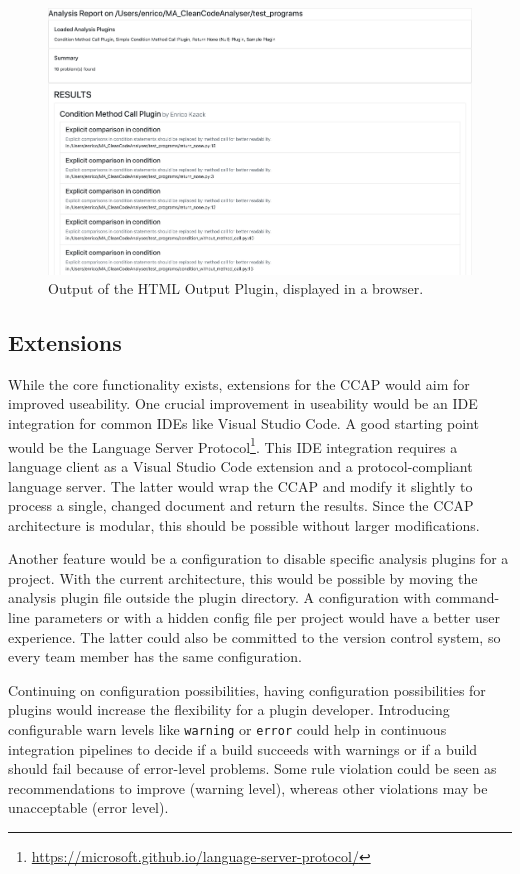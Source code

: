 \begin{figure}
    \includegraphics[width=1\textwidth]{img/CCAP/screenshot_html_output.png}
    \caption{Output of the HTML Output Plugin, displayed in a browser.}
    \label{fig:screen_html_output}
\end{figure}

\subsection{Extensions}
While the core functionality exists, extensions for the CCAP would aim for improved useability. One crucial improvement in useability would be an IDE integration for common IDEs like Visual Studio Code. A good starting point would be the Language Server Protocol\footnote{\url{https://microsoft.github.io/language-server-protocol/}}. This IDE integration requires a language client as a Visual Studio Code extension and a protocol-compliant language server. The latter would wrap the CCAP and modify it slightly to process a single, changed document and return the results. Since the CCAP architecture is modular, this should be possible without larger modifications. 

Another feature would be a configuration to disable specific analysis plugins for a project. With the current architecture, this would be possible by moving the analysis plugin file outside the plugin directory. A configuration with command-line parameters or with a hidden config file per project would have a better user experience. The latter could also be committed to the version control system, so every team member has the same configuration.

Continuing on configuration possibilities, having configuration possibilities for plugins would increase the flexibility for a plugin developer. Introducing configurable warn levels like \texttt{warning} or \texttt{error} could help in continuous integration pipelines to decide if a build succeeds with warnings or if a build should fail because of error-level problems. Some rule violation could be seen as recommendations to improve (warning level), whereas other violations may be unacceptable (error level).

